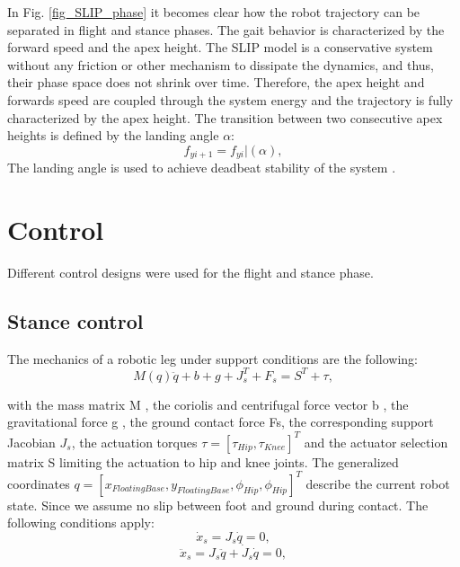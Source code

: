 \documentclass[10pt, conference]{IEEEtran}
\begin{document}
In Fig. \ref{fig_SLIP_phase} it becomes clear how the robot trajectory can be separated in flight and stance phases. The gait behavior is characterized by the forward speed and the apex height.
The SLIP model is a conservative system without any friction or other mechanism to dissipate the dynamics, and thus, their phase space does not shrink over time. 
Therefore, the apex height and forwards speed are coupled through the system energy and the trajectory is fully characterized by the apex height. 
The transition between two consecutive apex heights is defined by the landing angle \(\alpha\):
\begin{equation}
   {f}_{yi+1}={f}_{yi}|(\alpha),
\end{equation}
The landing angle is used to achieve deadbeat stability of the system \cite{Wu2014} \cite{Hutter2010}.




\section{Control}
\label{sec:Control}
Different control designs were used for the flight and stance phase. 

\subsection{Stance control}
The mechanics of a robotic leg under support conditions are the following:
\begin{equation}
   M(q)\ddot{q}+b+g+{J}_{s}^{T}+F_{s}=S^{T}+{\tau},
\end{equation}

with the mass matrix M , the coriolis and centrifugal force vector b , the gravitational force g , the ground contact force
Fs, the corresponding support Jacobian \({J}_{s}\), the actuation torques \(\tau = [{\tau}_{Hip}, {\tau}_{Knee}]^{T}\) and the actuator selection matrix S
limiting the actuation to hip and knee joints. The generalized coordinates  \(q = [x_{FloatingBase}, y_{FloatingBase}, {\phi}_{Hip}, {\phi}_{Hip}]^{T}\)
describe the current robot state. Since we assume no slip between foot and ground during contact. The following conditions apply: 
\begin{equation}
   \dot{x}_{s} = J_{s} \dot{q} = 0,
\end{equation}
\begin{equation}
   \ddot{x}_{s} = J_{s} \ddot{q} + \dot{J}_{s} \dot{q}=0,
\end{equation}
\end{document}
